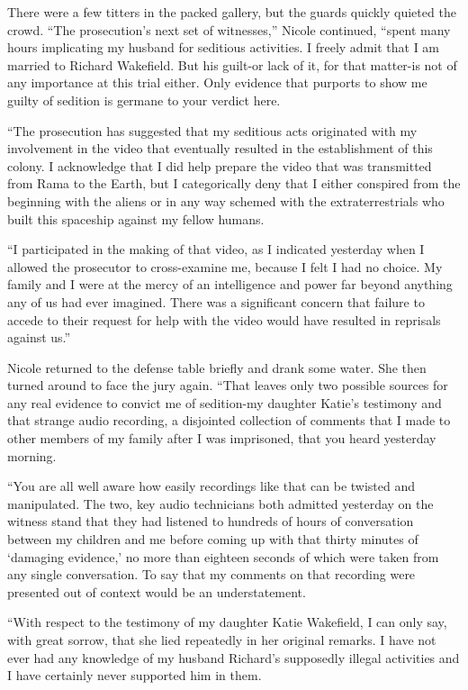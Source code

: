 \documentclass[]{article}
\begin{document}
{{There were a few titters in the packed gallery, but the guards quickly quieted the crowd. “The prosecution’s next set of witnesses,” Nicole continued, “spent many hours implicating my husband for seditious activities. I freely admit that I am married to Richard Wakefield. But his guilt-or lack of it, for that matter-is not of any importance at this trial either. Only evidence that purports to show me guilty of sedition is germane to your verdict here.

“The prosecution has suggested that my seditious acts originated with my involvement in the video that eventually resulted in the establishment of this colony. I acknowledge that I did help prepare the video that was transmitted from Rama to the Earth, but I categorically deny that I either conspired from the beginning with the aliens or in any way schemed with the extraterrestrials who built this spaceship against my fellow humans.

“I participated in the making of that video, as I indicated yesterday when I allowed the prosecutor to cross-examine me, because I felt I had no choice. My family and I were at the mercy of an intelligence and power far beyond anything any of us had ever imagined. There was a significant concern that failure to accede to their request for help with the video would have resulted in reprisals against us.”

Nicole returned to the defense table briefly and drank some water. She then turned around to face the jury again. “That leaves only two possible sources for any real evidence to convict me of sedition-my daughter Katie’s testimony and that strange audio recording, a disjointed collection of comments that I made to other members of my family after I was imprisoned, that you heard yesterday morning.

“You are all well aware how easily recordings like that can be twisted and manipulated. The two, key audio technicians both admitted yesterday on the witness stand that they had listened to hundreds of hours of conversation between my children and me before coming up with that thirty minutes of ‘damaging evidence,’ no more than eighteen seconds of which were taken from any single conversation. To say that my comments on that recording were presented out of context would be an understatement.

“With respect to the testimony of my daughter Katie Wakefield, I can only say, with great sorrow, that she lied repeatedly in her original remarks. I have not ever had any knowledge of my husband Richard’s supposedly illegal activities and I have certainly never supported him in them.

}}
\end{document}
